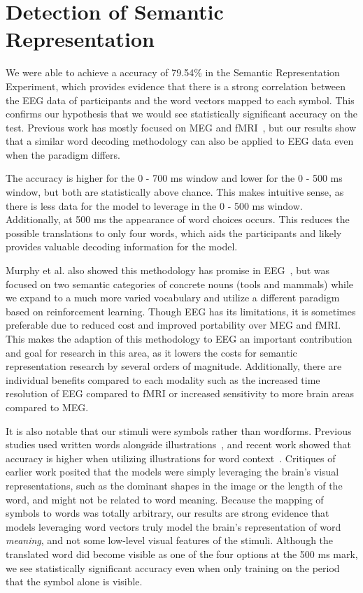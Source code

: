 \section{Detection of Semantic Representation}
\label{sec:discussion:semanticrepresentation}

We were able to achieve a \tvt accuracy of 79.54\% in the Semantic 
Representation Experiment, which provides evidence that there is a strong 
correlation between the EEG data of participants and the word vectors mapped to 
each symbol. This confirms our hypothesis that we would see statistically 
significant accuracy on the \tvt test. Previous work has mostly focused on MEG 
and fMRI~\cite{Mitchell2008,Sudre2012}, but our results show that a similar 
word decoding methodology can also be applied to EEG data even when the 
paradigm differs. 

The accuracy is higher for the 0 - 700 ms window and lower for the 0 - 500 ms 
window, but both are statistically above chance. This makes intuitive sense, as 
there is less data for the model to leverage in the 0 - 500 ms window.  
Additionally, at 500 ms the appearance of word choices occurs. This reduces the 
possible translations to only four words, which aids the participants and 
likely provides valuable decoding information for the model.

Murphy et al. also showed this methodology has promise in 
EEG~\cite{Murphy2009}, but was focused on two semantic categories of concrete 
nouns (tools and mammals) while we expand to a much more varied vocabulary and 
utilize a different paradigm based on reinforcement learning. Though EEG has 
its limitations, it is sometimes preferable due to reduced cost and improved 
portability over MEG and fMRI. This makes the adaption of this methodology to 
EEG an important contribution and goal for research in this area, as it lowers 
the costs for semantic representation research by several orders of magnitude.  
Additionally, there are individual benefits compared to each modality such as 
the increased time resolution of EEG compared to fMRI or increased sensitivity 
to more brain areas compared to MEG.

It is also notable that our stimuli were symbols rather than wordforms. 
Previous studies used written words alongside 
illustrations~\cite{Mitchell2008,Sudre2012}, and recent work showed that 
accuracy is higher when utilizing illustrations for word 
context~\cite{pereira2018toward}. Critiques of earlier work posited that the 
models were simply leveraging the brain's visual representations, such as the 
dominant shapes in the image or the length of the word, and might not be 
related to word meaning. Because the mapping of symbols to words was totally 
arbitrary, our results are strong evidence that models leveraging word vectors 
truly model the brain's representation of word \emph{meaning}, and not some 
low-level visual features of the stimuli. Although the translated word did 
become visible as one of the four options at the 500 ms mark, we see 
statistically significant \tvt accuracy even when only training on the period 
that the symbol alone is visible.

